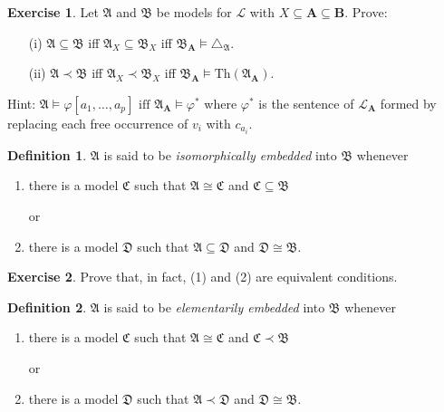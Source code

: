 \documentclass[titlepage, oneside]{amsbook}
\theoremstyle{plain}
\theoremstyle{definition}
\newtheorem{exercise}{Exercise}
\newtheorem{definition}{Definition}
\theoremstyle{remark}
\newcommand{\Th}{\ensuremath{\mbox{Th}}}
\newcommand{\tria}[1]{\ensuremath{\triangle_{\mathfrak{#1}}}}
\newcommand{\lan}{\ensuremath{\mathcal{L}}}
\newcommand{\seq}{\ensuremath{\subseteq}}
\newcommand{\ma}{\ensuremath{\mathfrak{A}}}
\newcommand{\mb}{\ensuremath{\mathfrak{B}}}
\newcommand{\mc}{\ensuremath{\mathfrak{C}}}
\newcommand{\md}{\ensuremath{\mathfrak{D}}}
\newcommand{\ba}{\ensuremath{\mathbf{A}}}
\newcommand{\bb}{\ensuremath{\mathbf{B}}}
\begin{document}
\begin{exercise}\label{X:expand} 
Let $\ma $ and $\mb$ be models for $\lan$ with $X \seq \ba \seq \bb$.  Prove:
\begin{itemize}
\item[(i)]   $\ma \seq \mb$ iff $\ma_X \seq \mb_X$ iff $\mb_\ba \models \tria A$.
\item[(ii)]  $\ma \prec \mb$ iff $\ma_X \prec \mb_X$ iff 
$ \mb_\ba \models \Th (\ma_\ba)$.
\end{itemize}

Hint: $\ma \models \varphi [ a_1 , \dots, a_p ] \mbox{ iff } \ma_\ba
\models \varphi^*$ where $\varphi^*$ is the sentence of $\lan_\ba$
formed
by replacing each free occurrence of $v_i$ with $c_{a_i}$.

 \end{exercise}




\begin{definition}\label{D:iso}
%
 $\mathfrak{A}$ is said to be
\emph{isomorphically embedded} into $\mathfrak{B}$ whenever 
\begin{enumerate} 
\item there is a model $\mathfrak{C}$ such that 
$\mathfrak{A} \cong \mathfrak{C}$ and 
$\mathfrak{C} \subseteq \mathfrak{B}$

\begin{flushleft} or
\end{flushleft}

\item there is a model $\mathfrak{D}$ such that 
$\mathfrak{A} \subseteq \mathfrak{D}$ and 
$\mathfrak{D} \cong \mathfrak{B}$.

\end{enumerate}
\end{definition}

\begin{exercise}\label{X:eeek} 
Prove that, in fact, (1) and (2) are equivalent conditions.
\end{exercise}

\begin{definition}
%
 $\ma$ is said to be \emph{elementarily embedded} into $\mb$ whenever 
\begin{enumerate}
\item there is a model $\mc$  such that $\ma \cong \mc $ and $\mc \prec \mb $

\begin{flushleft} or
\end{flushleft}

\item there is a model $\md$ such that $\ma \prec \md $ and $\md \cong \mb $.

\end{enumerate}

\end{definition}
\end{document}
